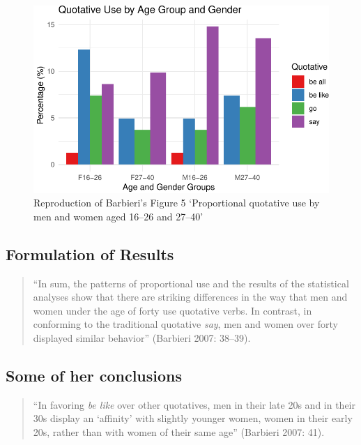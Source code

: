 \documentclass[
  11pt,
  letterpaper,
  DIV=11,
  numbers=noendperiod]{scrreprt}
\begin{document}
\begin{figure}[H]

{\centering \includegraphics{Basics_files/figure-pdf/unnamed-chunk-1-1.pdf}

}

\caption{Reproduction of Barbieri's Figure 5 `Proportional quotative use
by men and women aged 16--26 and 27--40'}

\end{figure}%

\subsection{Formulation of Results}\label{formulation-of-results}

\begin{quote}
``In sum, the patterns of proportional use and the results of the
statistical analyses show that there are striking differences in the way
that men and women under the age of forty use quotative verbs. In
contrast, in conforming to the traditional quotative \emph{say}, men and
women over forty displayed similar behavior'' (Barbieri 2007: 38--39).
\end{quote}

\subsection{Some of her conclusions}\label{some-of-her-conclusions}

\begin{quote}
``In favoring \emph{be like} over other quotatives, men in their late
20s and in their 30s display an `affinity' with slightly younger women,
women in their early 20s, rather than with women of their same age''
(Barbieri 2007: 41).
\end{quote}
\end{document}

